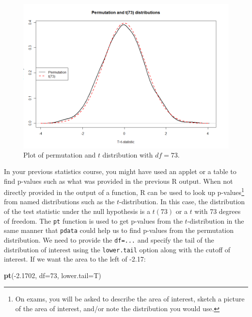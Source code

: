 \documentclass[]{book}
\newenvironment{Shaded}{\begin{snugshade}}{\end{snugshade}}
\newcommand{\KeywordTok}[1]{\textcolor[rgb]{0.13,0.29,0.53}{\textbf{{#1}}}}
\newcommand{\DataTypeTok}[1]{\textcolor[rgb]{0.13,0.29,0.53}{{#1}}}
\newcommand{\DecValTok}[1]{\textcolor[rgb]{0.00,0.00,0.81}{{#1}}}
\newcommand{\FloatTok}[1]{\textcolor[rgb]{0.00,0.00,0.81}{{#1}}}
\newcommand{\NormalTok}[1]{{#1}}
\let\rmarkdownfootnote\footnote%
\def\footnote{\protect\rmarkdownfootnote}
\begin{document}
\begin{figure}
\includegraphics[width=13.33in]{chapter1_files/image047} \caption{Plot of permutation and \(t\) distribution with \(df=73\).}\label{fig:Figure2-14}
\end{figure}

In your previous statistics course, you might have used an applet or a
table to find p-values such as what was provided in the previous R
output. When not directly provided in the output of a function, R can be
used to look up p-values\footnote{On exams, you will be asked to
  describe the area of interest, sketch a picture of the area of
  interest, and/or note the distribution you would use.} from named
distributions such as the \(t\)-distribution. In this case, the
distribution of the test statistic under the null hypothesis is a
\(t(73)\) or a \(t\) with 73 degrees of freedom. The \texttt{pt}
function is used to get p-values from the \(t\)-distribution in the same
manner that \texttt{pdata} could help us to find p-values from the
permutation distribution. We need to provide the \texttt{df=...} and
specify the tail of the distribution of interest using the
\texttt{lower.tail} option along with the cutoff of interest. If we want
the area to the left of -2.17:

\begin{Shaded}
\begin{Highlighting}[]
\KeywordTok{pt}\NormalTok{(-}\FloatTok{2.1702}\NormalTok{, }\DataTypeTok{df=}\DecValTok{73}\NormalTok{, }\DataTypeTok{lower.tail=}\NormalTok{T)}
\end{Highlighting}
\end{Shaded}
\end{document}
